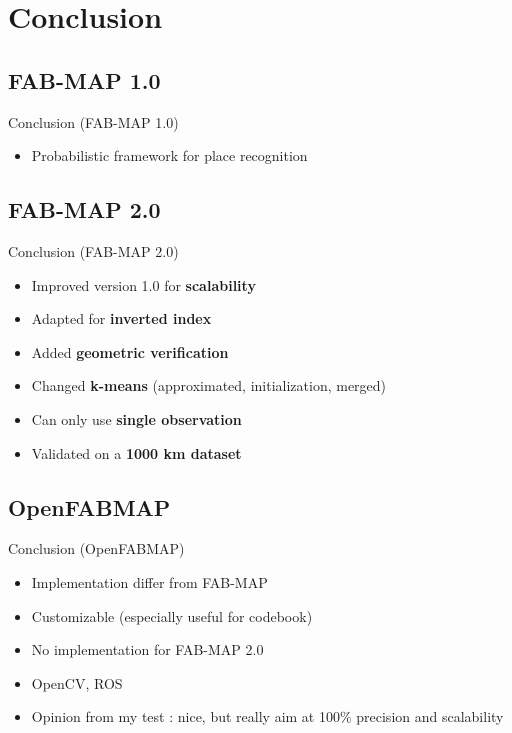 \section{Conclusion}

\subsection{FAB-MAP 1.0}
\begin{frame}{Conclusion (FAB-MAP 1.0)}
    \begin{itemize}
        \item Probabilistic framework for place recognition
    \end{itemize}
\end{frame}

\subsection{FAB-MAP 2.0}
\begin{frame}{Conclusion (FAB-MAP 2.0)}
    \begin{itemize}
        \item Improved version 1.0 for \textbf{scalability}
        \item Adapted for \textbf{inverted index}
        \item Added \textbf{geometric verification}
        \item Changed \textbf{k-means} (approximated, initialization, merged)
        \item Can only use \textbf{single observation}
        \item Validated on a \textbf{1000 km dataset}
    \end{itemize}
\end{frame}

\subsection{OpenFABMAP}
\begin{frame}{Conclusion (OpenFABMAP)}
    \begin{itemize}
        \item Implementation differ from FAB-MAP
        \item Customizable (especially useful for codebook)
        \item No implementation for FAB-MAP 2.0
        \item OpenCV, ROS
        \item Opinion from my test : nice, but really aim at 100\% precision and scalability
    \end{itemize}
\end{frame}
